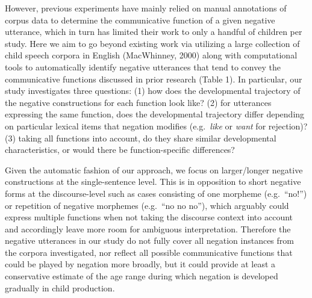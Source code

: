 \documentclass[
  english,
  man,floatsintext]{apa6}
\begin{document}
However, previous experiments have mainly relied on manual annotations of corpus data to determine the communicative function of a given negative utterance, which in turn has limited their work to only a handful of children per study.
Here we aim to go beyond existing work via utilizing a large collection of child speech corpora in English (MacWhinney, 2000) along with computational tools to automatically identify negative utterances that tend to convey the communicative functions discussed in prior research (Table 1). In particular, our study investigates three questions: (1) how does the developmental trajectory of the negative constructions for each function look like? (2) for utterances expressing the same function, does the developmental trajectory differ depending on particular lexical items that negation modifies (e.g.~\emph{like} or \emph{want} for rejection)? (3) taking all functions into account, do they share similar developmental characteristics, or would there be function-specific differences?

Given the automatic fashion of our approach, we focus on larger/longer negative constructions at the single-sentence level. This is in opposition to short negative forms at the discourse-level such as cases consisting of one morpheme (e.g.~``no!'') or repetition of negative morphemes (e.g.~``no no no''), which arguably could express multiple functions when not taking the discourse context into account and accordingly leave more room for ambiguous interpretation. Therefore the negative utterances in our study do not fully cover all negation instances from the corpora investigated, nor reflect all possible communicative functions that could be played by negation more broadly, but it could provide at least a conservative estimate of the age range during which negation is developed gradually in child production.
\end{document}
